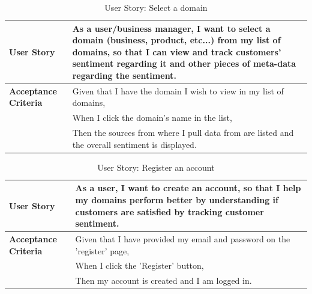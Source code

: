 \documentclass[12pt]{article}
\begin{document}
\begin{table}[htbp]
\caption{User Story: Select a domain}
\begin{tabular}{|p{}|p{}|}
\hline
\textbf{User Story} & As a user/business manager, I want to select a domain (business, product, etc...) from my list of domains, so that I can view and track customers' sentiment regarding it and other pieces of meta-data regarding the sentiment. \\
\hline
\textbf{Acceptance Criteria} & 
Given that I have the domain I wish to view in my list of domains,\\
& When I click the domain's name in the list,\\
& Then the sources from where I pull data from are listed and the overall sentiment is displayed. \\
\hline
\end{tabular}
\end{table}

\begin{table}[htbp]
\caption{User Story: Register an account}
\begin{tabular}{|p{}|p{}|}
\hline
\textbf{User Story} & As a user, I want to create an account, so that I help my domains perform better by understanding if customers are satisfied by tracking customer sentiment. \\
\hline
\textbf{Acceptance Criteria} & 
Given that I have provided my email and password on the 'register' page,\\
& When I click the 'Register' button,\\
& Then my account is created and I am logged in. \\
\hline
\end{tabular}
\end{table}
\end{document}
